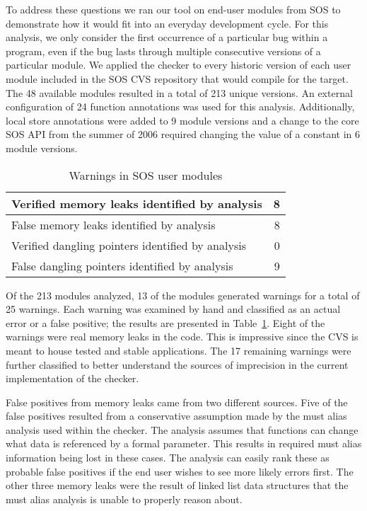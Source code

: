 To address these questions we ran our tool on 
end-user modules from SOS
to demonstrate
how it would fit into an everyday development cycle.  For this
analysis, we only consider the first occurrence of a particular bug
within a program, even if the bug lasts through multiple consecutive
versions of a particular module.  We applied the checker to every
historic version of each user module included in the SOS CVS
repository that would compile for the  target.  The 48
available modules resulted in a total of 213 unique versions.
%
An external configuration of 24 function annotations was used for this
analysis.  
%
Additionally, local store annotations were added to 9 module versions
and a change to the core SOS API from the summer of 2006 required
changing the value of a constant in 6 module versions.


\begin{table}
\caption{Warnings in SOS user modules}
%
\label{tab:module}
\centering 
\begin{tabular}{| l | r |}
    \hline 
    Verified memory leaks identified by analysis & 8 \\
    \hline
    False memory leaks identified by analysis & 8 \\
    \hline 
    Verified dangling pointers identified by analysis & 0 \\
    \hline 
    False dangling pointers identified by analysis & 9 \\
    \hline 
\end{tabular} 
%
\end{table}

Of the 213 modules analyzed, 13 of the modules generated warnings for a
total of 25 warnings.
%
Each warning was examined by hand and classified as an actual error or
a false positive; the results are presented in Table~\ref{tab:module}.  
%
Eight of the warnings were real memory leaks in the code.
This is impressive since the CVS is meant to house tested and stable
applications.
%
The 17 remaining warnings were further classified to better understand
the sources of imprecision in the current implementation of the
checker.  

\smallskip{}

False positives from memory leaks came from two different sources.
Five of the false positives resulted from a conservative assumption
made by the must alias analysis used within the checker.  The analysis
assumes that functions can change what data is referenced by a formal
parameter.  This results in required must alias information being lost
in these cases.  The analysis can easily rank these as probable false
positives if the end user wishes to see more likely errors first.  The
other three memory leaks were the result of linked list data structures
that the must alias analysis is unable to properly reason about.  

